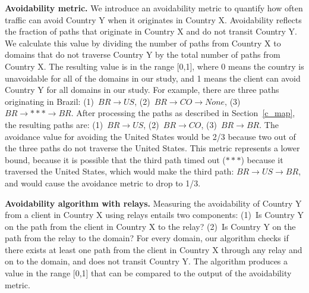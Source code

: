 {\bf Avoidability metric.}  We introduce an avoidability metric to
quantify how often
traffic can avoid Country Y when it originates in Country X.
Avoidability reflects the fraction of paths that originate in Country
X and do not transit Country Y.  We calculate this value by dividing the
number of paths from Country X to domains that do not traverse Country Y
by the total number of paths from Country X. The resulting value is
in the range [0,1], where 0 means the country is unavoidable for all of
the domains in our study, and 1 means the client can avoid Country Y for
all domains in our study.  For example, there are three paths
originating in Brazil: (1)~$BR \rightarrow US$, (2)~$BR \rightarrow CO
\rightarrow None$, (3)~$BR \rightarrow *** \rightarrow BR$.  After
processing the paths as described in Section~\ref{c_map}, the resulting
paths are: (1)~$BR \rightarrow US$, (2)~$BR \rightarrow CO$, (3)~$BR
\rightarrow BR$.  The avoidance value for avoiding the United States
would be 2/3 because two out of the three paths do not traverse the
United States.  This metric represents a lower bound,
because it is possible that the third path timed out ($***$) because it
traversed the United States, which would make the third path: $BR
\rightarrow US \rightarrow BR$, and would cause the avoidance metric to
drop to 1/3.

{\bf Avoidability algorithm with relays.}  Measuring the avoidability of Country Y
from a client in Country X using relays entails two components: (1)~Is Country Y
on the path from the client in Country X to the relay?  (2)~Is Country Y on
the path from the relay to the domain?  For every domain, our algorithm checks
if there exists at least one path from the client in Country X through any
relay and on to the domain, and does not transit Country Y.   The algorithm
 produces a value in the range [0,1] that can be
compared to the output of the avoidability metric.


